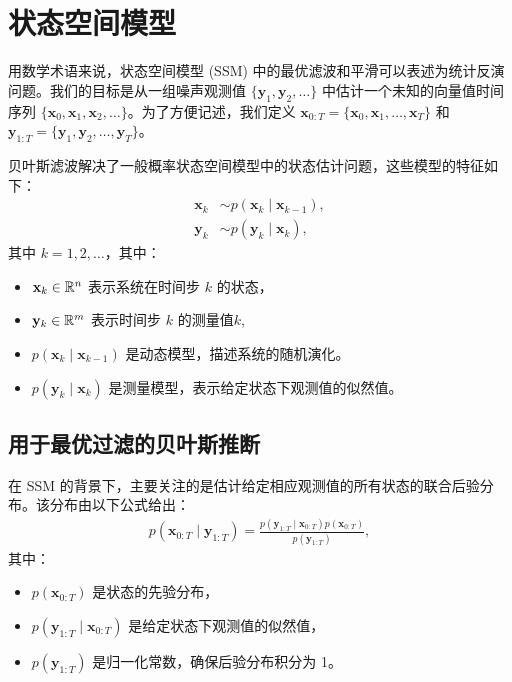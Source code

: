 \section{状态空间模型}
用数学术语来说，状态空间模型 (SSM) 中的最优滤波和平滑可以表述为统计反演问题。我们的目标是从一组噪声观测值 \(\{\mathbf{y}_1, \mathbf{y}_2, \dots\}\) 中估计一个未知的向量值时间序列 \(\{\mathbf{x}_0, \mathbf{x}_1, \mathbf{x}_2, \dots\}\)。为了方便记述，我们定义 \(\textbf{x}_{0:T} = \{ \textbf{x}_0, \textbf{x}_1, \dots, \textbf{x}_T \}\) 和 \(\textbf{y}_{1:T} = \{ \textbf{y}_1, \textbf{y}_2, \dots, \textbf{y}_T \}\)。

贝叶斯滤波解决了一般概率状态空间模型中的状态估计问题，这些模型的特征如下：
\begin{align*}
\mathbf{x}_k &\sim p(\mathbf{x}_k \mid \mathbf{x}_{k-1}), \\
\mathbf{y}_k &\sim p(\mathbf{y}_k \mid \mathbf{x}_k),
\end{align*}
其中 \(k = 1, 2, \dots\)，其中：
\begin{itemize}
\item \(\mathbf{x}_k \in \mathbb{R}^n\) 表示系统在时间步 \(k\) 的状态，
\item \(\mathbf{y}_k \in \mathbb{R}^m\) 表示时间步 \(k\) 的测量值\(k\),
\item \(p(\mathbf{x}_k \mid \mathbf{x}_{k-1})\) 是动态模型，描述系统的随机演化。
\item \(p(\mathbf{y}_k \mid \mathbf{x}_k)\) 是测量模型，表示给定状态下观测值的似然值。
\end{itemize}

\subsection{用于最优过滤的贝叶斯推断}
在 SSM 的背景下，主要关注的是估计给定相应观测值的所有状态的联合后验分布。该分布由以下公式给出：
\begin{align*}
p(\mathbf{x}_{0:T} \mid \mathbf{y}_{1:T}) = \frac{p(\mathbf{y}_{1:T} \mid \mathbf{x}_{0:T}) p(\mathbf{x}_{0:T})}{p(\mathbf{y}_{1:T})},
\end{align*}
其中：
\begin{itemize}
\item \(p(\mathbf{x}_{0:T})\) 是状态的先验分布，
\item \(p(\mathbf{y}_{1:T} \mid \mathbf{x}_{0:T})\) 是给定状态下观测值的似然值，
\item \(p(\mathbf{y}_{1:T})\) 是归一化常数，确保后验分布积分为 1。
\end{itemize}

